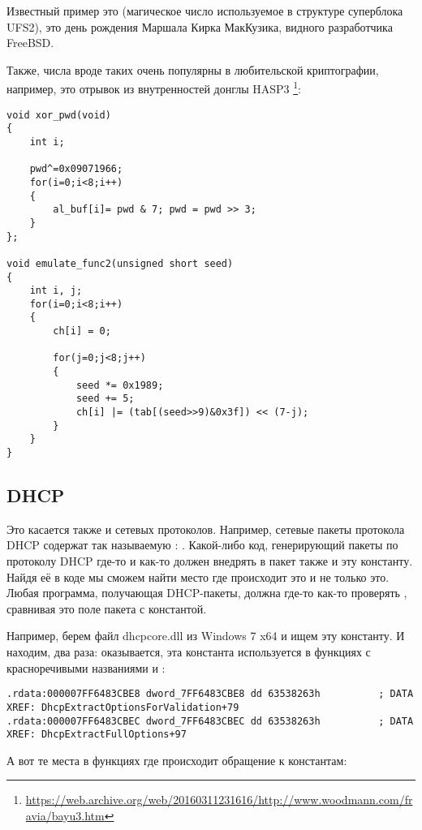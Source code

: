Известный пример это  (магическое число используемое в структуре суперблока UFS2), это день рождения Маршала Кирка МакКузика, видного разработчика FreeBSD.

Также, числа вроде таких очень популярны в любительской криптографии, например, это отрывок из внутренностей  донглы HASP3
\footnote{\url{https://web.archive.org/web/20160311231616/http://www.woodmann.com/fravia/bayu3.htm}}:

\begin{lstlisting}
void xor_pwd(void) 
{ 
	int i; 
	
	pwd^=0x09071966;
	for(i=0;i<8;i++) 
	{ 
		al_buf[i]= pwd & 7; pwd = pwd >> 3; 
	} 
};

void emulate_func2(unsigned short seed)
{ 
	int i, j; 
	for(i=0;i<8;i++) 
	{ 
		ch[i] = 0; 
		
		for(j=0;j<8;j++)
		{ 
			seed *= 0x1989; 
			seed += 5; 
			ch[i] |= (tab[(seed>>9)&0x3f]) << (7-j); 
		}
	} 
}
\end{lstlisting}

\subsection{DHCP}

Это касается также и сетевых протоколов. 
Например, сетевые пакеты протокола DHCP содержат так называемую : . 
Какой-либо код, генерирующий пакеты по протоколу DHCP где-то и как-то должен внедрять в пакет также и эту константу. 
Найдя её в коде мы сможем найти место где происходит это и не только это. 
Любая программа, получающая DHCP-пакеты, должна где-то как-то проверять , 
сравнивая это поле пакета с константой.

Например, берем файл dhcpcore.dll из Windows 7 x64 и ищем эту константу. 
И находим, два раза: оказывается, эта константа используется в функциях с красноречивыми 
названиями  и :

\begin{lstlisting}[caption=dhcpcore.dll (Windows 7 x64)]
.rdata:000007FF6483CBE8 dword_7FF6483CBE8 dd 63538263h          ; DATA XREF: DhcpExtractOptionsForValidation+79
.rdata:000007FF6483CBEC dword_7FF6483CBEC dd 63538263h          ; DATA XREF: DhcpExtractFullOptions+97
\end{lstlisting}

А вот те места в функциях где происходит обращение к константам:

